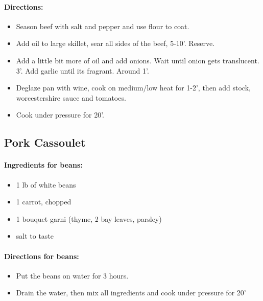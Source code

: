 \documentclass{article}
\begin{document}
\paragraph{Directions:}
\begin{itemize}
  \item Season beef with salt and pepper and use flour to coat.
  \item Add oil to large skillet, sear all sides of the beef, 5-10’. Reserve.
  \item Add a little bit more of oil and add onions. Wait until onion gets translucent. 3’. Add garlic until its
fragrant. Around 1’.
  \item Deglaze pan with wine, cook on medium/low heat for 1-2’, then add stock, worcestershire sauce and
tomatoes.
  \item Cook under pressure for 20’.
\end{itemize}

\subsection{Pork Cassoulet}

\paragraph{Ingredients for beans:}
\begin{itemize}
	\item 1 lb of white beans
	\item 1 carrot, chopped
	\item 1 bouquet garni (thyme, 2 bay leaves, parsley)
	\item salt to taste
\end{itemize}

\paragraph{Directions for beans:}
\begin{itemize}
	\item Put the beans on water for 3 hours.
	\item Drain the water, then mix all ingredients and cook under pressure for 20'
\end{itemize}
\end{document}
